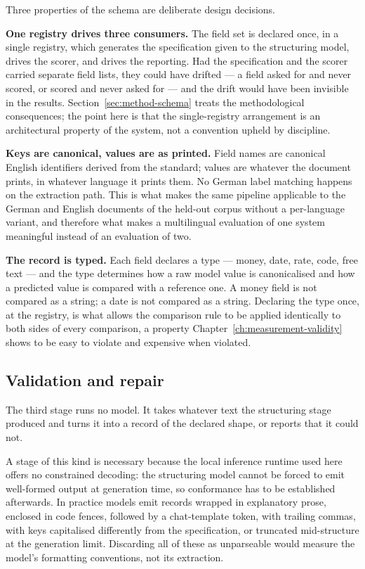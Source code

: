 Three properties of the schema are deliberate design decisions.

\textbf{One registry drives three consumers.} The field set is declared once, in a single
registry, which generates the specification given to the structuring model, drives the scorer,
and drives the reporting. Had the specification and the scorer carried separate field lists,
they could have drifted --- a field asked for and never scored, or scored and never asked for
--- and the drift would have been invisible in the results.
Section~\ref{sec:method-schema} treats the methodological consequences; the point here is that the
single-registry arrangement is an architectural property of the system, not a convention
upheld by discipline.

\textbf{Keys are canonical, values are as printed.} Field names are canonical English
identifiers derived from the standard; values are whatever the document prints, in whatever
language it prints them. No German label matching happens on the extraction path. This is what
makes the same pipeline applicable to the German and English documents of the held-out corpus
without a per-language variant, and therefore what makes a multilingual evaluation of one
system meaningful instead of an evaluation of two.

\textbf{The record is typed.} Each field declares a type --- money, date, rate, code, free text
--- and the type determines how a raw model value is canonicalised and how a predicted value is
compared with a reference one. A money field is not compared as a string; a date is not
compared as a string. Declaring the type once, at the registry, is what allows the comparison
rule to be applied identically to both sides of every comparison, a property
Chapter~\ref{ch:measurement-validity} shows to be easy to violate and expensive when violated.

\subsection{Validation and repair}
\label{sec:design-validation}

The third stage runs no model. It takes whatever text the structuring stage produced and turns
it into a record of the declared shape, or reports that it could not.

A stage of this kind is necessary because the local inference runtime used here offers no
constrained decoding: the structuring model cannot be forced to emit well-formed output at
generation time, so conformance has to be established afterwards. In practice models emit
records wrapped in explanatory prose, enclosed in code fences, followed by a chat-template
token, with trailing commas, with keys capitalised differently from the specification, or
truncated mid-structure at the generation limit. Discarding all of these as unparseable would
measure the model's formatting conventions, not its extraction.

